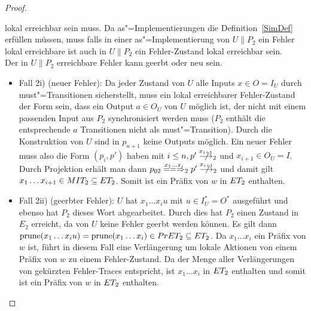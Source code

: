 \begin{proof}
\begin{itemize}
      lokal erreichbar sein muss. Da as"=Implementierungen die
      Definition~\ref{SimDef} erfüllen müssen, muss falls in einer
      as"=Implementierung von $U\|P_2$ ein Fehler lokal erreichbare ist auch in
      $U\|P_2$ ein Fehler-Zustand lokal erreichbar sein.\\
      Der in $U\|P_2$ erreichbare Fehler kann geerbt oder neu sein.
      \begin{itemize}
        \item Fall 2i) (neuer Fehler): Da jeder Zustand von $U$ alle Inputs
          $x\in O=I_U$ durch must"=Transitionen sicherstellt, muss ein lokal
          erreichbarer Fehler-Zustand der Form sein, dass ein Output $a\in O_U$
          von $U$ möglich ist, der nicht mit einem passenden Input aus $P_2$
          synchronisiert werden muss ($P_2$ enthält die entsprechende $a$
          Transitionen nicht als must"=Transition). Durch die Konstruktion von
          $U$ sind in $p_{n+1}$ keine Outputs möglich. Ein neuer
          Fehler muss also die Form $(p_i,p')$ haben mit $i\leq
          n, p'\nmust[x_{i+1}]_2$ und $x_{i+1}\in O_U=I$. Durch Projektion
          erhält man dann $p_{02}\lweakmay[x_1\dots x_i]_2p'\nmust[x_{i+1}]_2$
          und damit gilt $x_1\dots x_{i+1}\in MIT _2\subseteq ET _2$. Somit
          ist ein Präfix von $w$ in $ET _2$ enthalten.
        \item Fall 2ii) (geerbter Fehler): $U$ hat $x_1\dots x_iu$ mit $u\in
          I_U^*=O^*$ ausgeführt und ebenso hat $P_2$ dieses Wort abgearbeitet.
          Durch dies hat $P_2$ einen Zustand  in $E_2$ erreicht, da von $U$
          keine Fehler geerbt werden können. Es gilt dann $\mathrm{prune} (x_1\dots
          x_iu) = \mathrm{prune} (x_1\dots x_i)\in PrET _2\subseteq ET _2$. Da
          $x_1\dots x_i$ ein Präfix von $w$ ist, führt in diesem Fall eine
          Verlängerung um lokale Aktionen von einem Präfix von $w$ zu einem
          Fehler-Zustand. Da \ET{} der Menge aller Verlängerungen von gekürzten
          Fehler-Traces entspricht, ist $x_1\dots x_i$ in $ET
          _2$ enthalten und somit ist ein Präfix von $w$ in $ET _2$ enthalten.
      \end{itemize}
  \end{itemize}


\end{proof}
